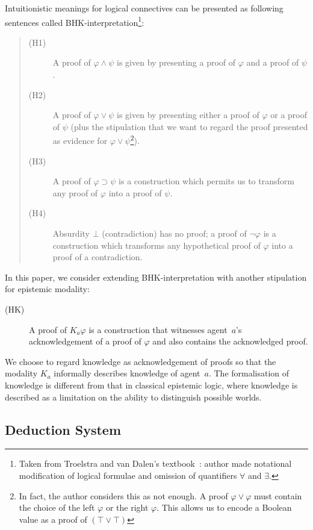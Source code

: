   Intuitionistic meanings for logical connectives
  can be presented as
  following sentences called BHK-interpretation\footnote{
  Taken from Troelstra and van Dalen's textbook~\cite[Ch.~1]{troelstra1988constructivism}:
  author made notational modification of logical formulae and omission of
  quantifiers $\forall$ and $\exists$.
  }:
  \begin{quotation}
   \noindent
   \begin{description}
    \item[(H1)] A proof of $\varphi\land \psi$ is given by presenting a proof of $\varphi$
	 and a proof of $\psi$.
    \item[(H2)] A proof of $\varphi\vee\psi$ is given by presenting either a proof of
	 $\varphi$ or a proof of $\psi$ (plus the stipulation that we want to regard
	 the proof presented as evidence for $\varphi\vee\psi$\footnote{In fact, the
	 author considers this as not enough. A proof $\varphi\vee\varphi$ must contain
	 the choice of the left $\varphi$ or the right $\varphi$.  This
	 allows us to encode a Boolean value as a proof of $(\top\lor\top)$}).
    \item[(H3)] A proof of $\varphi\supset\psi$ is a construction which permits us to
	 transform any proof of $\varphi$ into a proof of $\psi$.
    \item[(H4)] Absurdity $\bot$ (contradiction) has no proof; a proof of $\neg \varphi$ is a
	 construction which transforms any hypothetical proof of $\varphi$ into a proof
	 of a contradiction.
   \end{description}
  \end{quotation}
  In this paper, we consider extending BHK-interpretation with another stipulation for
  epistemic modality:
  \begin{description}
   \item[(HK)] A proof of $K_a\varphi$ is a construction that witnesses agent~$a$'s
	acknowledgement of a proof of $\varphi$ and also contains the acknowledged
	proof.
  \end{description}
  We choose to regard knowledge as acknowledgement of proofs so that the modality $K_a$ informally
  describes knowledge of agent~$a$.
  The formalisation of knowledge is different from that in classical epistemic logic, where
  knowledge is described as a limitation on the ability to distinguish possible worlds.

  \subsection{Deduction System}


